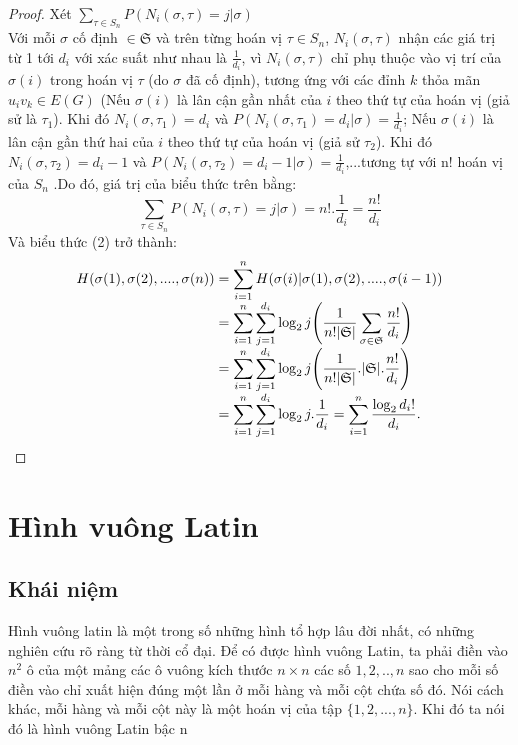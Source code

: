 \documentclass[a4paper, 12pt]{report}
\begin{document}
\begin{proof}
Xét $\displaystyle \sum_{\tau \in S_{n}}P(N_{i}(\sigma,\tau)=j | \sigma)$ \\
Với mỗi $\sigma$ cố định $\in \mathfrak{S}$ và trên từng hoán vị $\tau \in S_{n}$,  $N_{i}(\sigma,\tau)$ nhận các giá trị từ 1 tới $d_{i}$ với xác suất như nhau là $\frac{1}{d_{i}}$, vì $N_{i}(\sigma,\tau)$ chỉ phụ thuộc vào vị trí của $\sigma(i)$ trong hoán vị $\tau$ (do $\sigma$ đã cố định), tương ứng với các đỉnh $k$ thỏa mãn $u_{i}v_{k} \in E(G)$ (Nếu  $\sigma(i)$ là lân cận gần nhất của $i$ theo thứ tự của hoán vị (giả sử là $\tau_{1}$).  Khi đó $N_{i}(\sigma,\tau_{1}) = d_{i}$ và $P(N_{i}(\sigma,\tau_{1})=d_{i} | \sigma)=\frac{1}{d_{i}}$; Nếu  $\sigma(i)$ là lân cận gần thứ hai của $i$ theo thứ tự của hoán vị (giả sử $\tau_{2}$). Khi đó $N_{i}(\sigma,\tau_{2}) = d_{i}-1$ và $P(N_{i}(\sigma,\tau_{2})=d_{i}-1 | \sigma)=\frac{1}{d_{i}}$,...tương tự với n! hoán vị của $S_{n}$ .Do đó, giá trị của biểu thức trên bằng:
\begin{equation*}
    \displaystyle \sum_{\tau \in S_{n}}P(N_{i}(\sigma,\tau)=j | \sigma)=n!.\frac{1}{d_{i}} = \frac{n!}{d_{i}}
\end{equation*}
Và biểu thức (2) trở thành: 
\begin{equation*}
\begin{array}{l@{}l}
H(\sigma (1), \sigma (2), ....  ,\sigma (n)) 
&{}= \displaystyle \sum_{i=1}^{n}H(\sigma (i)| \sigma (1), \sigma (2), ....  ,\sigma (i-1)) \\
&{} =  \displaystyle \sum_{i=1}^{n}\displaystyle \sum_{j=1}^{d_{i}}\log_{2}j \Bigg(\frac{1}{n!|\mathfrak{S}|}\displaystyle \sum_{\sigma \in \mathfrak{S}}\frac{n!}{d_{i}} \Bigg) \\
 &{}= \displaystyle \sum_{i=1}^{n}\displaystyle \sum_{j=1}^{d_{i}}\log_{2}j \Bigg(\frac{1}{n!|\mathfrak{S}|}.|\mathfrak{S}|.\frac{n!}{d_{i}} \Bigg) \\
 &{}= \displaystyle \sum_{i=1}^{n}\displaystyle \sum_{j=1}^{d_{i}}\log_{2}j.\frac{1}{d_{i}} =\displaystyle \sum_{i=1}^{n} \frac{\log_{2}d_{i}!}{d_{i}}.  				\qedhere
\end{array}
\end{equation*}
\end{proof}

\chapter{Hình vuông Latin}
\section{Khái niệm}
Hình vuông latin là một trong số những hình tổ hợp lâu đời nhất, có những nghiên cứu rõ ràng từ thời cổ đại. Để có được hình vuông Latin, ta phải điền vào $n^{2}$ ô của một mảng các ô vuông kích thước $n \times n$ các số $1,2,..,n$ sao cho mỗi số điền vào chỉ xuất hiện đúng một lần ở mỗi hàng và mỗi cột chứa số đó. Nói cách khác, mỗi hàng và mỗi cột này là một hoán vị của tập $\{1,2,...,n\}$. Khi đó ta nói đó là hình vuông Latin bậc n
\end{document}
